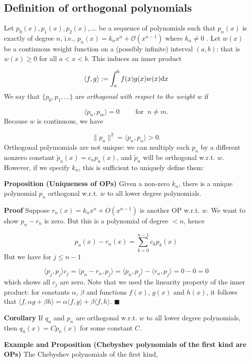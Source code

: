\documentclass[12pt,landscape]{article}
\begin{document}
{\subsection{Definition of orthogonal polynomials}
Let $p_0(x),p_1(x),p_2(x),\ensuremath{\ldots}$ be a sequence of polynomials such that $p_n(x)$ is exactly of degree $n$, i.e., $p_n(x) = k_n x^n + \mathcal{O}(x^{n-1})$ where $k_n \neq 0$ .  Let $w(x)$ be a continuous weight function on a (possibly infinite) interval $(a,b)$: that is $w(x) \geq 0$ for all $a < x < b$. This induces an inner product

\[
\langle f,g \rangle := \int_a^b f(x) g(x) w(x) {\rm d}x
\]
We say that $\{p_0, p_1,\ldots\}$ are \emph{orthogonal with respect to the weight $w$} if

\[
\langle p_n,p_m \rangle = 0\qquad \text{ for }\: n \neq m.
\]
Because $w$ is continuous, we have

\[
\| p_n \|^2 = \langle p_n,p_n \rangle > 0 .
\]
Orthogonal polymomials are not unique: we can multiply each $p_n$ by a different nonzero constant $\tilde p_n(x) = c_n p_n(x)$, and $\tilde p_n$ will be orthogonal w.r.t. $w$.  However, if we specify $k_n$, this is sufficient to uniquely define them:

\textbf{Proposition (Uniqueness of OPs)} Given a non-zero $k_n$, there is a unique polynomial $p_n$ orthogonal w.r.t. $w$ to all lower degree polynomials.

\textbf{Proof} Suppose $r_n(x) = k_n x^n + O(x^{n-1})$ is another  OP w.r.t. $w$. We want to show $p_n - r_n$ is zero. But this is a polynomial of degree $<n$, hence

\[
p_n(x) - r_n(x) = \sum_{k=0}^{n-1} c_k p_k(x)
\]
But we have for $j \leq n-1$

\[
\langle p_j,p_j \rangle c_j = \langle p_n - r_n, p_j \rangle = \langle p_n,p_j \rangle - \langle r_n, p_j\rangle = 0 - 0 = 0
\]
which shows all $c_j$ are zero.  Note that we used the linearity property of the inner product: for constants $\alpha$, $\beta$ and functions $f(x)$, $g(x)$ and $h(x)$, it follows that $\langle  f,\alpha g + \beta h\rangle = \alpha\langle f, g\rangle + \beta\langle f, h \rangle $.  $\blacksquare$

\textbf{Corollary} If $q_n$ and $p_n$ are orthogonal w.r.t. $w$ to all lower degree polynomials, then $q_n(x) = C p_n(x)$ for some constant $C$.

\textbf{Example and Proposition (Chebyshev polynomials of the first kind are OPs)} The Chebyshev polynomials of the first kind,

}
\end{document}
